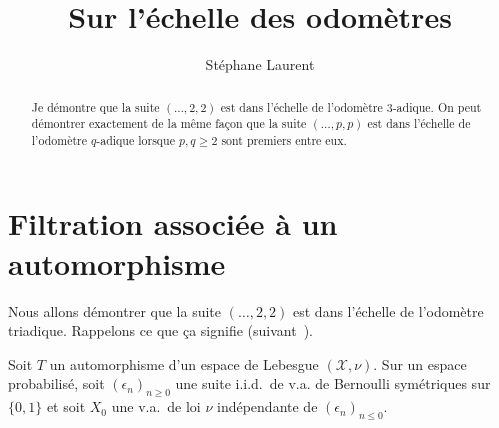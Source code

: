\documentclass[12pt,a4paper]{article}
\author{Stéphane Laurent}
\title{Sur l'échelle des odomètres}
\begin{document}
\theoremstyle{defstyle}
\newtheorem{definition}{Definition}
\newtheorem{remark}{Remark}
\newtheorem{question}{Question}
\newtheorem{clarify}{To clarify}
\theoremstyle{thmstyle}
\newtheorem{thm}{Theorem}[section]
\newtheorem{ppsition}{Proposition}
\newtheorem{lemme}{Lemme}

\newcommand{\BB}{\mathcal{B}}
\newcommand{\FF}{\mathcal{F}}
\newcommand{\GG}{\mathcal{G}}
\newcommand{\EE}{\mathbb{E}}
\newcommand{\II}{\mathcal{I}}
\newcommand{\LL}{\mathcal{L}}
\newcommand{\OO}{\mathcal{O}}
\newcommand{\R}{\mathbb{R}}
\newcommand{\XX}{\mathcal{X}}
\newcommand{\T}{\mathbb{T}}
\newcommand{\Z}{\mathbb{Z}}
\newcommand{\given}{\mid}
\newcommand{\eps}{\epsilon}
\newcommand{\indic}{\boldsymbol 1}
\newcommand{\Vb}{\boldsymbol V}

\newcommand{\indvee}{\dot{\vee}}
\newcommand{\indep}{\mathrel{\text{\scalebox{1.07}{$\perp\mkern-10mu\perp$}}}}

\newcommand{\disp}{\textrm{disp}\,}
\newcommand{\dd}{\mathrm{d}}


\maketitle

\begin{abstract}
Je démontre que la suite $(\ldots, 2, 2)$ est dans l'échelle de l'odomètre $3$-adique. 
On peut démontrer exactement de la même façon que la suite 
$(\ldots, p, p)$ est dans l'échelle de l'odomètre $q$-adique lorsque $p,q \geq 2$ sont 
premiers entre eux.
\end{abstract}

\section{Filtration associée à un automorphisme}

Nous allons démontrer que la suite $(\ldots, 2, 2)$ est dans l'échelle 
de l'odomètre triadique. 
Rappelons ce que ça signifie (suivant~\cite{LauXLV}).

Soit $T$ un automorphisme d'un espace de Lebesgue $(\XX,\nu)$. 
Sur un espace probabilisé, soit ${(\epsilon_n)}_{n \geq 0}$ 
une suite i.i.d.\ de v.a. de Bernoulli symétriques sur $\{0,1\}$ 
et soit $X_0$ une v.a.\ de loi $\nu$ 
 indépendante de ${(\epsilon_n)}_{n \leq 0}$. 
\end{document}
